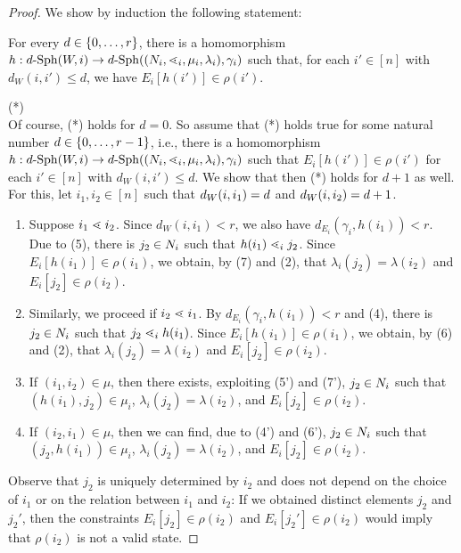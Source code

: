 \documentclass{LMCS}
\begin{document}
\begin{proof}
  We show by induction the following statement:
  \vspace{1.5ex}\\
  \hspace*{\fill}
   \begin{minipage}{.8\linewidth}
     For every $d \in \{0,\ldots,r\}$, there is a homomorphism $h:
     d\text{-}\mathrm{Sph}(W,i) \rightarrow
     d\text{-}\mathrm{Sph}((N_i,\mathord{\lessdot}_i,\mu_i,\lambda_i),\gamma_i)$ such that, for
     each $i' \in [n]$ with $d_W(i,i') \le d$, we have $E_i[h(i')] \in
     \rho(i')$.
   \end{minipage}
   \hspace{\fill}(*) \vspace{1.5ex}\\ Of course, (*) holds for $d=0$. So
   assume that (*) holds true for some natural number $d \in
   \{0,\ldots,r-1\}$, i.e., there is a homomorphism $h: d\text{-}\mathrm{Sph}(W,i)
   \rightarrow d\text{-}\mathrm{Sph}((N_i,\mathord{\lessdot}_i,\mu_i,\lambda_i),\gamma_{i})$ such
   that $E_i[h(i')] \in \rho(i')$ for each $i' \in [n]$ with $d_W(i,i') \le
   d$. We show that then (*) holds for $d+1$ as well. For this, let $i_1,i_2
   \in [n]$ such that $d_W(i,i_1) = d$ and $d_W(i,i_2) = d+1$.
\begin{enumerate}[$\bullet$]
\item Suppose $i_1 \mathrel{\lessdot} i_2$. Since $d_W(i,i_1) < r$, we also have
  $d_{E_i}(\gamma_i,h(i_1)) < r$. Due to (5), there is $j_2 \in N_i$ such that
  $h(i_1) \mathrel{\lessdot}_i j_2$. Since $E_i[h(i_1)] \in \rho(i_1)$, we obtain, by (7)
  and (2), that $\lambda_i(j_2) = \lambda(i_2)$ and $E_i[j_2] \in \rho(i_2)$.
\item Similarly, we proceed if $i_2 \mathrel{\lessdot} i_1$. By
  $d_{E_i}(\gamma_i,h(i_1)) < r$ and (4), there is $j_2 \in N_i$ such that
  $j_2 \mathrel{\lessdot}_i h(i_1)$. Since $E_i[h(i_1)] \in \rho(i_1)$, we obtain, by
  (6) and (2), that $\lambda_i(j_2) = \lambda(i_2)$ and $E_i[j_2] \in
  \rho(i_2)$.
\item If $(i_1,i_2) \in \mu$, then there exists, exploiting (5') and (7'),
  $j_2 \in N_i$ such that $(h(i_1),j_2) \in \mu_i$, $\lambda_i(j_2) =
  \lambda(i_2)$, and $E_i[j_2] \in \rho(i_2)$.
 \item If $(i_2,i_1) \in \mu$, then we can find, due to (4') and (6'), $j_2
   \in N_i$ such that $(j_2,h(i_1)) \in \mu_i$, $\lambda_i(j_2) =
   \lambda(i_2)$, and $E_i[j_2] \in \rho(i_2)$.
\end{enumerate}
Observe that $j_2$ is uniquely determined by $i_2$ and does not depend on the
choice of $i_1$ or on the relation between $i_1$ and $i_2$: If we obtained
distinct elements $j_2$ and $j_2'$, then the constraints $E_i[j_2] \in
\rho(i_2)$ and $E_i[j_2'] \in \rho(i_2)$ would imply that $\rho(i_2)$ is not a
valid state.


\end{proof}
\end{document}
